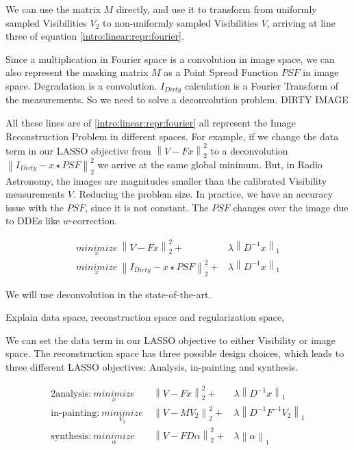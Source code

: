 We can use the matrix $M$ directly, and use it to transform from uniformly sampled Visibilities $V_2$ to non-uniformly sampled Visibilities $V$, arriving at line three of equation \eqref{intro:linear:repr:fourier}.

Since a multiplication in Fourier space is a convolution in image space, we can also represent the masking matrix $M$ as a Point Spread Function $PSF$ in image space. Degradation is a convolution. $I_{Dirty}$ calculation is a Fourier Transform of the measurements. So we need to solve a deconvolution problem.
DIRTY IMAGE

All these lines are of \eqref{intro:linear:repr:fourier} all represent the Image Reconstruction Problem in different spaces. For example, if we change the data term in our LASSO objective from $\left \| V - Fx \right \|_2^2$ to a deconvolution $\left \| I_{Dirty} - x \star PSF \right \|_2^2$ we arrive at the same global minimum. But, in Radio Astronomy, the images are magnitudes smaller than the calibrated Visibility measurements $V$.
Reducing the problem size.
In practice, we have an accuracy issue with the $PSF$, since it is not constant. The $PSF$ changes over the image due to DDEs like $w$-correction.


\begin{equation} \label{intro:linear:repr:deconv}
\begin{split}
\underset{x}{minimize}\: \left \| V - Fx \right \|_2^2 + &\lambda \left \| D^{-1}x \right \|_1  \\
\underset{x}{minimize}\: \left \| I_{Dirty} - x \star PSF \right \|_2^2 + &\lambda \left \| D^{-1}x \right \|_1
\end{split}
\end{equation}

We will use deconvolution in the state-of-the-art.

Explain data space, reconstruction space and regularization space,

We can set the data term in our LASSO objective to either Visibility or image space. The reconstruction space has three possible design choices, which leads to three different LASSO objectives: Analysis, in-painting and synthesis.

\begin{alignat}{2}
\text{analysis:}\: \underset{x}{minimize}\:& \left \| V - Fx \right \|_2^2 + &\lambda \left \| D^{-1}x \right \|_1  \\
\text{in-painting:}\: \underset{V_2}{minimize}\:& \left \| V - MV_2 \right \|_2^2 + &\lambda \left \| D^{-1}F^{-1}V_2 \right \|_1 \label{intro:linear:repr:in} \\
\text{synthesis:}\: \underset{\alpha}{minimize}\:& \left \| V - FD\alpha \right \|_2^2 + &\lambda \left \| \alpha \right \|_1  
\end{alignat}

